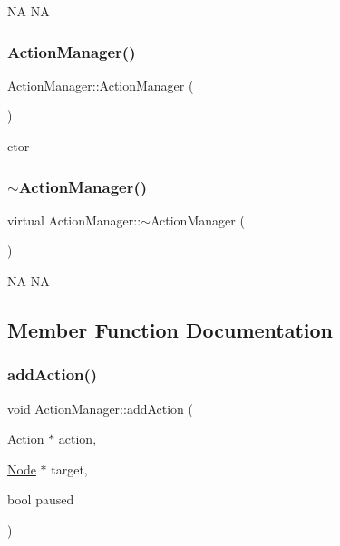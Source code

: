 NA  NA \mbox{\label{classActionManager_a7d0c405d568795fba0c51f411e77b821}} 
\subsubsection{\texorpdfstring{Action\+Manager()}{ActionManager()}\hspace{0.1cm}{\footnotesize\ttfamily [2/2]}}
{\footnotesize\ttfamily Action\+Manager\+::\+Action\+Manager (\begin{DoxyParamCaption}{ }\end{DoxyParamCaption})}

ctor \mbox{\label{classActionManager_ad11fb012c44ddeb403559ec25744f463}} 
\subsubsection{\texorpdfstring{$\sim$\+Action\+Manager()}{~ActionManager()}\hspace{0.1cm}{\footnotesize\ttfamily [2/2]}}
{\footnotesize\ttfamily virtual Action\+Manager\+::$\sim$\+Action\+Manager (\begin{DoxyParamCaption}{ }\end{DoxyParamCaption})\hspace{0.3cm}{\ttfamily [virtual]}}

NA  NA 

\subsection{Member Function Documentation}
\mbox{\label{classActionManager_a88568fe751ad6e412b375e34b5584173}} 
\subsubsection{\texorpdfstring{add\+Action()}{addAction()}\hspace{0.1cm}{\footnotesize\ttfamily [1/2]}}
{\footnotesize\ttfamily void Action\+Manager\+::add\+Action (\begin{DoxyParamCaption}\item[{\hyperlink{classAction}{Action} $\ast$}]{action,  }\item[{\hyperlink{classNode}{Node} $\ast$}]{target,  }\item[{bool}]{paused }\end{DoxyParamCaption})}

